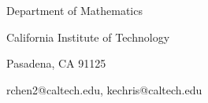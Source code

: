 \documentclass[11pt]{article}
\begin{document}
\printindex


\bigskip
\noindent Department of Mathematics

\noindent California Institute of Technology

\noindent Pasadena, CA 91125

\medskip
\noindent\textsf{rchen2@caltech.edu, kechris@caltech.edu}
\end{document}
